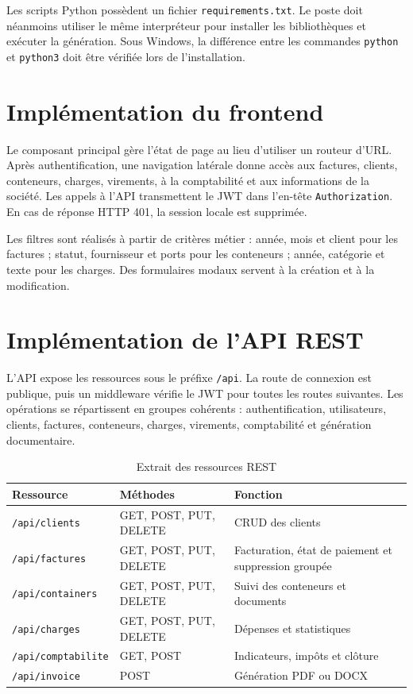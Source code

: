 \documentclass[12pt,a4paper,oneside]{report}
\newcommand{\code}[1]{\texttt{#1}}
\begin{document}
Les scripts Python possèdent un fichier \code{requirements.txt}. Le poste doit néanmoins utiliser le même interpréteur pour installer les bibliothèques et exécuter la génération. Sous Windows, la différence entre les commandes \code{python} et \code{python3} doit être vérifiée lors de l'installation.

\section{Implémentation du frontend}
Le composant principal gère l'état de page au lieu d'utiliser un routeur d'URL. Après authentification, une navigation latérale donne accès aux factures, clients, conteneurs, charges, virements, à la comptabilité et aux informations de la société. Les appels à l'API transmettent le JWT dans l'en-tête \code{Authorization}. En cas de réponse HTTP 401, la session locale est supprimée.

Les filtres sont réalisés à partir de critères métier : année, mois et client pour les factures ; statut, fournisseur et ports pour les conteneurs ; année, catégorie et texte pour les charges. Des formulaires modaux servent à la création et à la modification.

\section{Implémentation de l'API REST}
L'API expose les ressources sous le préfixe \code{/api}. La route de connexion est publique, puis un middleware vérifie le JWT pour toutes les routes suivantes. Les opérations se répartissent en groupes cohérents : authentification, utilisateurs, clients, factures, conteneurs, charges, virements, comptabilité et génération documentaire.

\begin{table}[H]\centering
\caption{Extrait des ressources REST}
\begin{tabularx}{\textwidth}{p{3.2cm}p{3.5cm}Y}
\toprule \textbf{Ressource} & \textbf{Méthodes} & \textbf{Fonction}\\ \midrule
\code{/api/clients} & GET, POST, PUT, DELETE & CRUD des clients\\
\code{/api/factures} & GET, POST, PUT, DELETE & Facturation, état de paiement et suppression groupée\\
\code{/api/containers} & GET, POST, PUT, DELETE & Suivi des conteneurs et documents\\
\code{/api/charges} & GET, POST, PUT, DELETE & Dépenses et statistiques\\
\code{/api/comptabilite} & GET, POST & Indicateurs, impôts et clôture\\
\code{/api/invoice} & POST & Génération PDF ou DOCX\\
\bottomrule
\end{tabularx}
\end{table}
\end{document}

